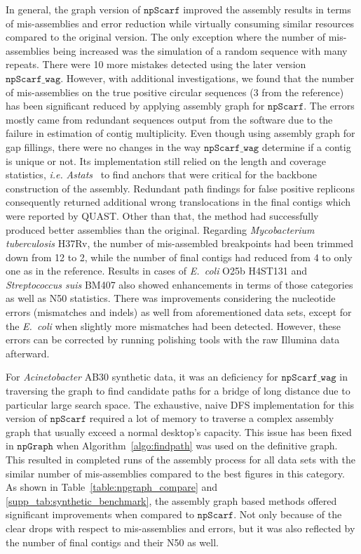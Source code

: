 \documentclass[10pt,twocolumn,twoside]{genpaper}
\newcommand{\npscarf}{$\mathtt{npScarf}$}
\newcommand{\npscarfg}{$\mathtt{npScarf\_wag}$}
\newcommand{\npgraph}{$\mathtt{npGraph}$}
\newcommand{\ec}{\emph{E.~coli}}
\newcommand{\IE}{\emph{i.e.}}
\begin{document}
In general, the graph version of \npscarf{} improved the assembly results in terms of mis-assemblies and error reduction while virtually consuming similar resources compared to the original version.
The only exception where the number of mis-assemblies being increased was the simulation of a random sequence with many repeats. There were 10 more mistakes detected using the later version \npscarfg{}. However, with additional investigations, we found that the number of mis-assemblies on the true positive circular sequences (3 from the reference) has been significant reduced by applying assembly graph for \npscarf{}. The errors mostly came from redundant sequences output from the software due to the failure in estimation of contig multiplicity.
Even though using assembly graph for gap fillings, there were no changes in the way \npscarfg{} determine if a contig is unique or not. 
Its implementation still relied on the length and coverage statistics, \IE{} \emph{Astats}~\cite{MyersSD2000} to find anchors that were critical for the backbone construction of the assembly.
Redundant path findings for false positive replicons consequently returned additional wrong translocations in the final contigs which were reported by QUAST. 
Other than that, the method had successfully produced better assemblies than the original. Regarding \emph{Mycobacterium tuberculosis} H37Rv, the number of mis-assembled breakpoints had been trimmed down from 12 to 2, while the number of final contigs had reduced from 4 to only one as in the reference. Results in cases of \ec{} O25b H4ST131 and \emph{Streptococcus suis} BM407 also showed enhancements in terms of those categories as well as N50 statistics. 
There was improvements considering the nucleotide errors (mismatches and indels) as well from aforementioned data sets, except for the \ec{} when slightly more mismatches had been detected. However, these errors can be corrected by running polishing tools with the raw Illumina data afterward. 

For \emph{Acinetobacter} AB30 synthetic data, it was an deficiency for \npscarfg{} in traversing the graph to find candidate paths for a bridge of long distance due to particular large search space.
The exhaustive, naive DFS implementation for this version of \npscarf{} required a lot of memory to traverse a complex assembly graph that usually exceed a normal desktop's capacity.
This issue has been fixed in \npgraph{} when Algorithm~\ref{algo:findpath} was used on the definitive graph. This resulted in completed runs of the assembly process for all data sets with the similar number of mis-assemblies compared to the best figures in this category.
As shown in Table~\ref{table:npgraph_compare} and \ref{supp_tab:synthetic_benchmark}, the assembly graph based methods offered significant improvements when compared to \npscarf{}. Not only because of the clear drops with respect to mis-assemblies and errors, but it was also reflected by the number of final contigs and their N50 as well.
\end{document}
